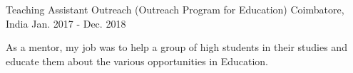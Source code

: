 \begin{cventries}
  \cventry
    {Teaching Assistant}
    {Outreach (Outreach Program for Education)}
    {Coimbatore, India}
    {Jan. 2017 - Dec. 2018}
    {
      \begin{cvitems}
        \item {As a mentor, my job was to help a group of high students in their studies and educate them about the various opportunities in Education.}
      \end{cvitems}
    }
\end{cventries}
